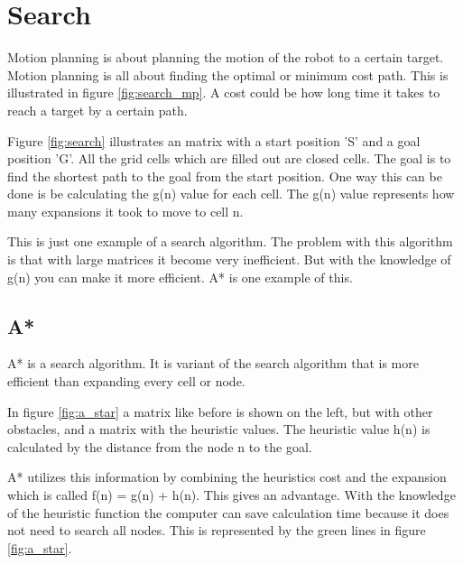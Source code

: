 \chapter{Search}
\label{chp:search}
Motion planning is about planning the motion of the robot to a certain target. Motion planning is all about finding the optimal or minimum cost path. This is illustrated in figure \ref{fig:search_mp}. A cost could be how long time it takes to reach a target by a certain path.


Figure \ref{fig:search} illustrates an matrix with a start position 'S' and a goal position 'G'. All the grid cells which are filled out are closed cells. The goal is to find the shortest path to the goal from the start position. One way this can be done is be calculating the g(n) value for each cell. The g(n) value represents how many expansions it took to move to cell n.


This is just one example of a search algorithm. The problem with this algorithm is that with large matrices it become very inefficient. But with the knowledge of g(n) you can make it more efficient. A* is one example of this.  
\section{A*}

A* is a search algorithm. It is variant of the search algorithm that is more efficient than expanding every cell or node.


In figure \ref{fig:a_star} a matrix like before is shown on the left, but with other obstacles, and a matrix with the heuristic values. The heuristic value h(n) is calculated by the distance from the node n to the goal.

A* utilizes this information by combining the heuristics cost and the expansion which is called f(n) = g(n) + h(n). This gives an advantage. With the knowledge of the heuristic function the computer can save calculation time because it does not need to search all nodes. This is represented by the green lines in figure \ref{fig:a_star}.